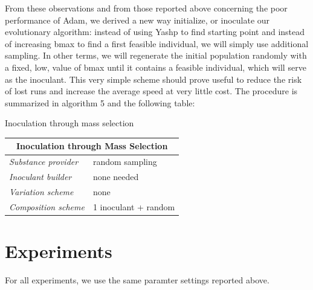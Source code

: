 \documentclass[english]{DESCARWINreport}
\begin{document}
From these observations and from those reported above concerning the poor performance of Adam, we derived a new way initialize, or inoculate our evolutionary algorithm: instead of using Yashp to find starting point and instead of increasing bmax to find a first feasible individual, we will simply use additional sampling. In other terms, we will regenerate the initial population randomly with a fixed, low, value of bmax until it contains a feasible individual, which will serve as the inoculant. This very simple scheme should prove useful to reduce the risk of lost runs and increase the average speed at very little cost. The procedure is summarized in algorithm 5 and  the following table:


\begin{algorithm}[h!]
\caption{Inoculation through mass selection}
\label{algoInit}
{\small
\begin{algorithmic}[1]
 \hfill {}


 \hfill {}
\ENDIF
\ENDFOR
\ENDWHILE
\end{algorithmic}
}
\end{algorithm}


\begin{center}
\begin{tabular}{|l|l|}
  \hline
  \multicolumn{2}{|c|}{\bf Inoculation through Mass Selection} \\
  \hline
  \emph{Substance provider} & random sampling \\
  \emph{Inoculant builder} & none needed \\
	\emph{Variation scheme} & none \\
	\emph{Composition scheme} & 1 inoculant + random \\
  \hline
\end{tabular}
\end{center}

\section{Experiments}

For all experiments, we use the same paramter settings reported above.
\end{document}
